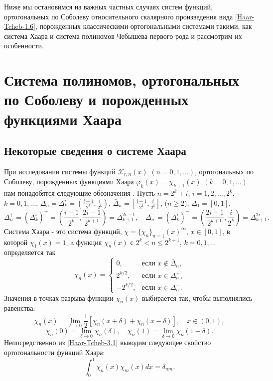 Ниже мы остановимся на  важных частных случаях систем функций, ортогональных по Соболеву относительного скалярного произведения вида  \eqref{Haar-Tcheb-1.6}, порожденных  классическими ортогональными системами такими, как система  Хаара и система  полиномов Чебышева первого рода и рассмотрим их особенности.

\chapter{Система полиномов, ортогональных по Соболеву и порожденных функциями Хаара}
\section{Некоторые сведения о системе  Хаара}
При исследовании системы функций $\mathcal{X}_{r,n}(x)$ $(n=0,1,\ldots)$, ортогональных по Соболеву, порожденных функциями  Хаара $\varphi_k(x)=\chi_{k+1}(x)$ $(k=0,1,\ldots)$ нам понадобятся следующие обозначения \cite{Haar-Tcheb-KashSaak}. Пусть $n=2^k+i$, $i=1,2,\ldots, 2^k$,  $k=0,1,\ldots$,
$\Delta_n=\Delta_k^i=(\frac{i-1}{2^k},\frac{i}{2^k})$, $\bar\Delta_n=[\frac{i-1}{2^k},\frac{i}{2^k}]$, ($n\ge2$), $\Delta_1=[0,1]$,
$$
 \Delta_n^+=(\Delta_k^i)^+=(\frac{i-1}{2^k},\frac{2i-1}{2^{k+1}})=\Delta_{k+1}^{2i-1}, \quad \Delta_n^-=(\Delta_k^i)^-=(\frac{2i-1}{2^{k+1}},\frac{i}{2^{k}})=\Delta_{k+1}^{2i}.
$$
Система Хаара - это система функций, $\chi=\{\chi_n\}_{n=1}(x)^\infty$, $x\in[0,1]$, в которой $\chi_1(x)=1$, a функция $\chi_n(x)$
с $2^k<n\le 2^{k+1}$, $k=0,1,\ldots$ определяется так
\begin{equation}\label{Haar-Tcheb-3.1}
\chi_n(x)=\begin{cases} 0,&\text{если $x\notin \bar\Delta_n$,}\\
2^{k/2},& \text{если $x\in \Delta_n^+$,}\\
-2^{k/2},& \text{если $x\in \Delta_n^-$.}
\end{cases}
\end{equation}
Значения в точках разрыва функции $\chi_n(x)$ выбирается так, чтобы выполнялись равенства:
$$
\chi_n(x)=\lim_{\delta\to0}\frac12[\chi_n(x+\delta)+\chi_n(x-\delta)],\quad x\in (0,1),
$$
$$
\chi_n(0)=\lim_{\delta\to0} \chi_n(\delta),\quad \chi_n(1)=\lim_{\delta\to0} \chi_n(1-\delta).
$$
Непосредственно из \eqref{Haar-Tcheb-3.1} выводим следующее свойство ортогональности функций Хаара:
\begin{equation}\label{Haar-Tcheb-eq3.2}
\int_0^1\chi_n(x)\chi_m(x)dx=\delta_{nm}.
\end{equation}
